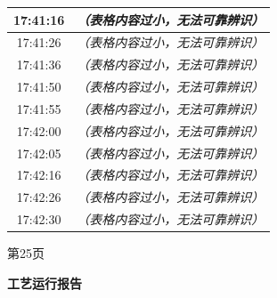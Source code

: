 \documentclass[UTF8,10pt,a4paper,fontset=fandol]{ctexart}
\begin{document}
\begin{center}
\begin{minipage}[t]{0.47\textwidth}
\begin{tabularx}{\linewidth}{|c|X|}
17:41:16 & \textit{（表格内容过小，无法可靠辨识）} \\ \hline
17:41:26 & \textit{（表格内容过小，无法可靠辨识）} \\ \hline
17:41:36 & \textit{（表格内容过小，无法可靠辨识）} \\ \hline
17:41:50 & \textit{（表格内容过小，无法可靠辨识）} \\ \hline
17:41:55 & \textit{（表格内容过小，无法可靠辨识）} \\ \hline
17:42:00 & \textit{（表格内容过小，无法可靠辨识）} \\ \hline
17:42:05 & \textit{（表格内容过小，无法可靠辨识）} \\ \hline
17:42:16 & \textit{（表格内容过小，无法可靠辨识）} \\ \hline
17:42:26 & \textit{（表格内容过小，无法可靠辨识）} \\ \hline
17:42:30 & \textit{（表格内容过小，无法可靠辨识）} \\ \hline
\end{tabularx}

\vspace{3pt}
第25页
\end{minipage}
\hfill
\begin{minipage}[t]{0.47\textwidth}
\centering
\textbf{工艺运行报告}


\end{minipage}
\end{center}
\end{document}
